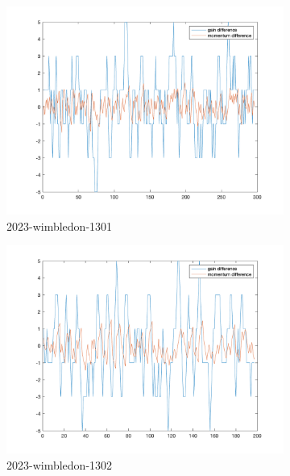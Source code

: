 \begin{figure}[htbp]
    \centering
    \begin{subfigure}[b]{0.34\textwidth}
        \includegraphics[width=\linewidth]{mainmatter/photos/diff_match1.png}
        \caption{2023-wimbledon-1301}
    \end{subfigure}\hspace{-0.02\textwidth}
    \begin{subfigure}[b]{0.34\textwidth}
        \includegraphics[width=\linewidth]{mainmatter/photos/diff_match2.png}
        \caption{2023-wimbledon-1302}
    \end{subfigure}\hspace{-0.02\textwidth}
    \begin{subfigure}[b]{0.34\textwidth}

\end{subfigure}
\end{figure}
